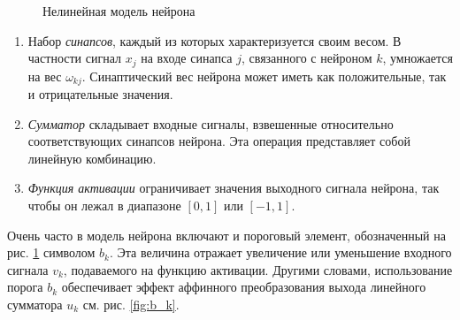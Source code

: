 \documentclass[a4paper,12pt]{report}
\begin{document}
\begin{figure}[!htb]
{
    }
    \caption{Нелинейная модель нейрона}
    \label{fig:nonlinear neuron model}
\end{figure}

\begin{enumerate}
    \item Набор \textit{синапсов}, каждый из которых характеризуется своим
        весом. В частности сигнал $x_j$ на входе синапса $j$,
        связанного с нейроном $k$, умножается на вес $\omega_{kj}$.
        Синаптический вес нейрона может иметь как положительные, так и
        отрицательные значения.
    \item \textit{Сумматор} складывает входные сигналы, взвешенные относительно
        соответствующих синапсов нейрона. Эта операция представляет
        собой линейную комбинацию.
    \item \textit{Функция активации} ограничивает значения выходного
        сигнала нейрона, так чтобы он лежал в диапазоне $[0,1]$ или
        $[-1,1]$.
\end{enumerate}

Очень часто в модель нейрона включают и пороговый элемент,
обозначенный на рис. \ref{fig:nonlinear neuron model} символом $b_k$. Эта величина отражает
увеличение или уменьшение входного сигнала $v_k$, подаваемого на функцию
активации. Другими словами, использование порога $b_k$ обеспечивает
эффект аффинного преобразования выхода линейного сумматора $u_k$ см.
рис. \ref{fig:b_k}.
\end{document}
